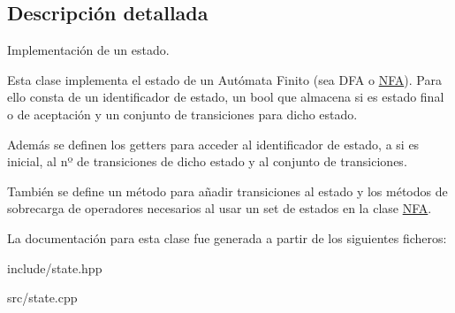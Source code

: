 \subsection{Descripción detallada}
Implementación de un estado. 

Esta clase implementa el estado de un Autómata Finito (sea D\+FA o \mbox{\hyperlink{class_n_f_a}{N\+FA}}). Para ello consta de un identificador de estado, un bool que almacena si es estado final o de aceptación y un conjunto de transiciones para dicho estado.

Además se definen los getters para acceder al identificador de estado, a si es inicial, al nº de transiciones de dicho estado y al conjunto de transiciones.

También se define un método para añadir transiciones al estado y los métodos de sobrecarga de operadores necesarios al usar un set de estados en la clase \mbox{\hyperlink{class_n_f_a}{N\+FA}}. 

La documentación para esta clase fue generada a partir de los siguientes ficheros\+:\begin{DoxyCompactItemize}
\item 
include/state.\+hpp\item 
src/state.\+cpp\end{DoxyCompactItemize}
